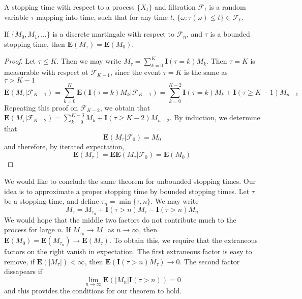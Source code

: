 \begin{definition}
    A stopping time with respect to a process $\{ X_t \}$ and filtration $\mathcal{F}_t$ is a random variable $\tau$ mapping into time, such that for any time $t$, $\{ \omega : \tau(\omega) \leq t \} \in \mathcal{F}_t$.
\end{definition}

\begin{lemma}
    If $\{ M_0, M_1, \dots \}$ is a discrete martingale with respect to $\mathcal{F}_n$, and $\tau$ is a bounded stopping time, then $\mathbf{E}(M_\tau) = \mathbf{E}(M_0)$.
\end{lemma}
\begin{proof}
    Let $\tau \leq K$. Then we may write $M_{\tau} = \sum_{k = 0}^K \mathbf{I}(\tau = k) M_k$. Then $\tau = K$ is measurable with respect ot $\mathcal{F}_{K-1}$, since the event $\tau = K$ is the same as $\tau > K-1$
    \[ \mathbf{E}(M_\tau | \mathcal{F}_{K-1}) = \sum_{k = 0}^K \mathbf{E} (\mathbf{I}(\tau = k) M_k | \mathcal{F}_{K-1}) = \sum_{k = 0}^{K-2} \mathbf{I}(\tau = k) M_k + \mathbf{I}(\tau \geq K-1) M_{n-1} \]
    Repeating this proof on $\mathcal{F}_{K-2}$, we obtain that $\mathbf{E}(M_\tau | \mathcal{F}_{K-2}) = \sum_{k = 0}^{K-3} M_k + \mathbf{I}(\tau \geq K - 2) M_{n-2}$. By induction, we determine that 
    \[ \mathbf{E}(M_\tau | \mathcal{F}_0) = M_0 \]
    and therefore, by iterated expectation,
    \[ \mathbf{E}(M_\tau) = \mathbf{E}\mathbf{E}(M_\tau | \mathcal{F}_0) = \mathbf{E}(M_0) \]
\end{proof}

We would like to conclude the same theorem for unbounded stopping times. Our idea is to approximate a proper stopping time by bounded stopping times. Let $\tau$ be a stopping time, and define $\tau_n = \min \{ \tau, n \}$. We may write
%
\[ M_\tau = M_{\tau_n} + \mathbf{I}(\tau > n) M_\tau - \mathbf{I}(\tau > n) M_n \]
%
We would hope that the middle two factors do not contribute much to the process for large $n$. If $M_{\tau_n} \to M_\tau$ as $n \to \infty$, then $\mathbf{E}(M_0) = \mathbf{E}(M_{\tau_n}) \to \mathbf{E}(M_\tau)$. To obtain this, we require that the extraneous factors on the right vanish in expectation. The first extraneous factor is easy to remove, if $\mathbf{E}(|M_\tau|) < \infty$, then $\mathbf{E}(\mathbf{I}(\tau > n) M_\tau) \to 0$. The second factor dissapears if
%
\[ \lim_{n \to \infty} \mathbf{E}(|M_n| \mathbf{I}(\tau > n)) = 0 \]
%
and this provides the conditions for our theorem to hold.

